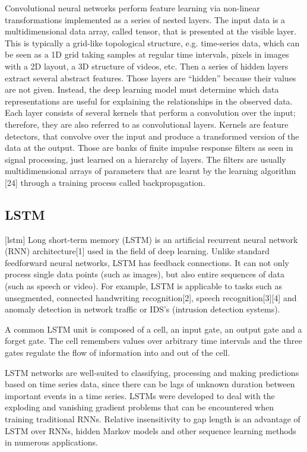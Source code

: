\documentclass{turabian-thesis}
\begin{document}
Convolutional neural networks perform feature learning via non-linear transformations implemented as a series of nested layers. The input data is a multidimensional data array, called tensor, that is presented at the visible layer. This is typically a grid-like topological structure, e.g. time-series data, which can be seen as a 1D grid taking samples at regular time intervals, pixels in images with a 2D layout, a 3D structure of videos, etc. Then a series of hidden layers extract several abstract features. Those layers are “hidden” because their values are not given. Instead, the deep learning model must determine which data representations are useful for explaining the relationships in the observed data. Each layer consists of several kernels that perform a convolution over the input; therefore, they are also referred to as convolutional layers. Kernels are feature detectors, that convolve over the input and produce a transformed version of the data at the output. Those are banks of finite impulse response filters as seen in signal processing, just learned on a hierarchy of layers. The filters are usually multidimensional arrays of parameters that are learnt by the learning algorithm [24] through a training process called backpropagation.


\subsection{LSTM}

[lstm]
Long short-term memory (LSTM) is an artificial recurrent neural network (RNN) architecture[1] used in the field of deep learning. Unlike standard feedforward neural networks, LSTM has feedback connections. It can not only process single data points (such as images), but also entire sequences of data (such as speech or video). For example, LSTM is applicable to tasks such as unsegmented, connected handwriting recognition[2], speech recognition[3][4] and anomaly detection in network traffic or IDS's (intrusion detection systems).

A common LSTM unit is composed of a cell, an input gate, an output gate and a forget gate. The cell remembers values over arbitrary time intervals and the three gates regulate the flow of information into and out of the cell.


LSTM networks are well-suited to classifying, processing and making predictions based on time series data, since there can be lags of unknown duration between important events in a time series. LSTMs were developed to deal with the exploding and vanishing gradient problems that can be encountered when training traditional RNNs. Relative insensitivity to gap length is an advantage of LSTM over RNNs, hidden Markov models and other sequence learning methods in numerous applications.
\end{document}
